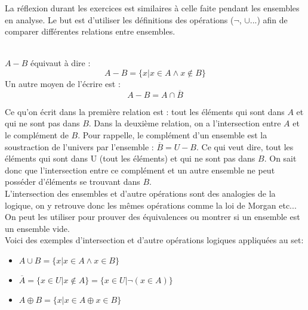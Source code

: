 \noexpand La réflexion durant les exercices est similaires à celle faite pendant les ensembles en analyse. Le but est d'utiliser les définitions des opérations ($\neg$, $\cup$...) afin de comparer différentes relations entre ensembles. 
\\
\begin{exemple}
\\

$A - B$ équivaut à dire : 
\begin{equation*}
    A - B = \{ x | x \in A \wedge x \notin B\}
\end{equation*}
Un autre moyen de l'écrire est :
\begin{equation*}
    A - B = A \cap \overline{B}
\end{equation*}
\end{exemple}
Ce qu'on écrit dans la première relation est : tout les éléments qui sont dans $A$ et qui ne sont pas dans $B$. Dans la deuxième relation, on a l'intersection entre $A$ et le complément de $B$. Pour rappelle, le complément d'un ensemble est la soustraction de l'univers par l'ensemble : $\overline{B} = U - B$. Ce qui veut dire, tout les éléments qui sont dans U (tout les éléments) et qui ne sont pas dans $B$. On sait donc que l'intersection entre ce complément et un autre ensemble ne peut posséder d'éléments se trouvant dans $B$.
\\
L'intersection des ensembles et d'autre opérations sont des analogies de la logique, on y retrouve donc les mêmes opérations comme la loi de Morgan etc... On peut les utiliser pour prouver des équivalences ou montrer si un ensemble est un ensemble vide.
\hspace{0.4cm}
\\
\hspace{0.4cm}
Voici des exemples d'intersection et d'autre opérations logiques appliquées au set: 
\begin{itemize}
    \item $A \cup B = \{x|x \in A \wedge x \in B\}$
    \item $\overline{A} = \{x \in U | x \notin A\} = \{x \in U | \neg( x \in A )\}$
    \item $A \oplus B = \{x|x \in A \oplus x \in B\}$
\end{itemize}
\\
\hspace{0.6cm}
